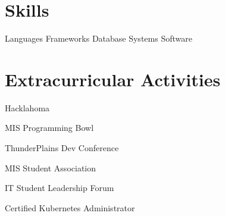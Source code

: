 \documentclass[letterpaper]{resumeconfig}
\begin{document}

\section{Skills}

\begin{Skills}
	\SkillCategory
	{Languages}
	{
		     
	}
	\SkillCategory
	{Frameworks}
	{
		      
	}
	\SkillCategory
	{Database Systems}
	{
		   
	}
	\SkillCategory
	{Software}
	{
		       
	}	
\end{Skills}
\vspace{-0.5em}


\section{Extracurricular Activities}

    \begin{ActivitiesList}
        \item Hacklahoma
        \item MIS Programming Bowl
        \item ThunderPlains Dev Conference
        \item MIS Student Association
        \item IT Student Leadership Forum
        \item Certified Kubernetes Administrator
    \end{ActivitiesList}
\end{document}
